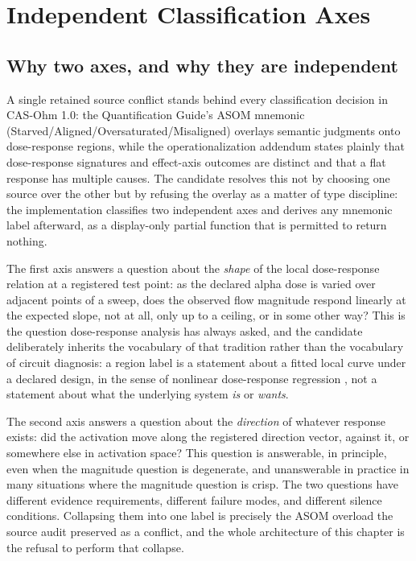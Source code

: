 \chapter{Independent Classification Axes}\label{ch07:classification}

\section{Why two axes, and why they are independent}\label{ch07:sec:why}

A single retained source conflict stands behind every classification
decision in CAS-Ohm 1.0: the Quantification Guide's ASOM mnemonic
(Starved/Aligned/Oversaturated/Misaligned) overlays semantic judgments onto
dose-response regions, while the operationalization addendum states plainly
that dose-response signatures and effect-axis outcomes are distinct and that a
flat response has multiple causes. The candidate resolves this not by choosing
one source over the other but by refusing the overlay as a matter of type
discipline: the implementation classifies two independent axes and derives any
mnemonic label afterward, as a display-only partial function that is permitted
to return nothing.

The first axis answers a question about the \emph{shape} of the local
dose-response relation at a registered test point: as the declared alpha dose
is varied over adjacent points of a sweep, does the observed flow magnitude
respond linearly at the expected slope, not at all, only up to a ceiling, or
in some other way? This is the question dose-response analysis has always
asked, and the candidate deliberately inherits the vocabulary of that
tradition rather than the vocabulary of circuit diagnosis: a region label is a
statement about a fitted local curve under a declared design, in the sense of
nonlinear dose-response regression \cite{ritz}, not a statement about what the
underlying system \emph{is} or \emph{wants}.

The second axis answers a question about the \emph{direction} of whatever
response exists: did the activation move along the registered direction
vector, against it, or somewhere else in activation space? This question is
answerable, in principle, even when the magnitude question is degenerate, and
unanswerable in practice in many situations where the magnitude question is
crisp. The two questions have different evidence requirements, different
failure modes, and different silence conditions. Collapsing them into one
label is precisely the ASOM overload the source audit preserved as a conflict,
and the whole architecture of this chapter is the refusal to perform that
collapse.

